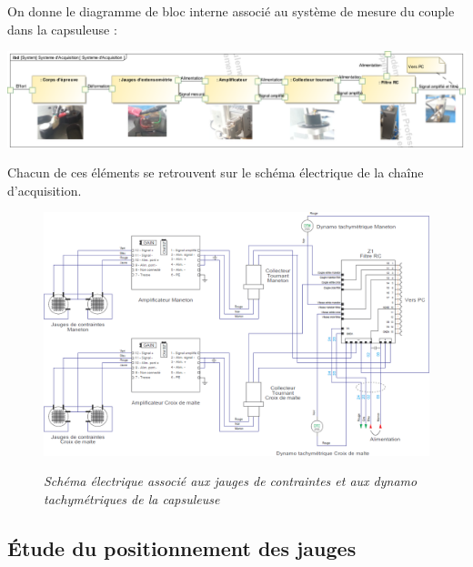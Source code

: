 \documentclass[10pt]{article}
\begin{document}
\vspace{.25cm}



On donne le diagramme de bloc interne associé au système de mesure du couple dans la capsuleuse :
\begin{center}
\includegraphics[width=\textwidth]{images/ibd}
\end{center}

Chacun de ces éléments se retrouvent sur le schéma électrique de la chaîne d'acquisition.

\begin{figure}[!ht]
\begin{center}
\includegraphics[width=\textwidth]{images/SchemaElec}

\textit{Schéma électrique associé aux jauges de contraintes et aux dynamo tachymétriques de la capsuleuse} 
\end{center}
\end{figure}


\subsection*{Étude du positionnement des jauges}
\end{document}
